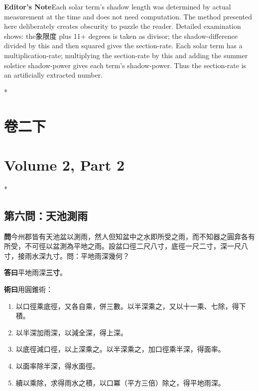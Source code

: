 \documentclass[11pt,a4paper]{article}
\newcommand{\WenCN}{\textbf{\color{headcolor}問}}
\newcommand{\DaCN}{\textbf{\color{headcolor}答曰}}
\newcommand{\ShuCN}{\textbf{\color{headcolor}術曰}}
\newcommand{\AnEN}{\textbf{\color{headcolor}Editor's Note}}
\begin{document}
\vspace{0.5em}
\AnEN{}\quad Each solar term's shadow length was determined by actual measurement at the time and does not need computation. The method presented here deliberately creates obscurity to puzzle the reader. Detailed examination shows: the象限度 plus 11+ degrees is taken as divisor; the shadow-difference divided by this and then squared gives the section-rate. Each solar term has a multiplication-rate; multiplying the section-rate by this and adding the summer solstice shadow-power gives each term's shadow-power. Thus the section-rate is an artificially extracted number.

\newpage

\switchcolumn[0]*
\section*{卷二下}

\switchcolumn[1]
\section*{Volume 2, Part 2}

\vspace{1em}

\switchcolumn[0]*
\subsection*{第六問：天池測雨}

\vspace{0.5em}
\WenCN{}\quad 今州郡皆有天池盆以測雨，然人但知盆中之水即所受之雨，而不知器之圓弇各有所受，不可徑以盆測為平地之雨。設盆口徑二尺八寸，底徑一尺二寸，深一尺八寸，接雨水深九寸。問：平地雨深幾何？

\vspace{0.5em}
\DaCN{}\quad 平地雨深\textbf{三寸}。

\vspace{0.5em}
\ShuCN{}\quad 用圓錐術：
\begin{enumerate}[noitemsep,topsep=0pt]
  \item 以口徑乘底徑，又各自乘，併三數。以半深乘之，又以十一乘、七除，得下積。
  \item 以半深加雨深，以減全深，得上深。
  \item 以底徑減口徑，以上深乘之。以半深乘之，加口徑乘半深，得面率。
  \item 以面率除半深，得水面徑。
  \item 續以乘除，求得雨水之積，以口冪（平方三倍）除之，得平地雨深。
\end{enumerate}
\end{document}
